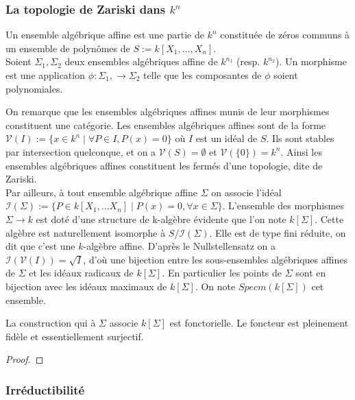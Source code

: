 \subsubsection{La topologie de Zariski dans $k^n$}
\begin{defn}
Un ensemble algébrique affine est une partie de $k^n$ constituée de zéros communs à un ensemble de polynômes de $S:=k[X_1,...,X_n]$.\\
Soient $\Sigma_1,\Sigma_2$ deux ensembles algébriques affine de $k^{n_1}$ (resp. $k^{n_2}$). Un morphisme est une application $\phi:\Sigma_1,\rightarrow \Sigma_2$ telle que les composantes de $\phi$ soient polynomiales.
\end{defn}
On remarque que les ensembles algébriques affines munis de leur morphismes constituent une catégorie. 
Les ensembles algébriques affines sont de la forme $\mathcal{V}(I):=\lbrace x\in k^n\mid \forall P\in I, P(x)=0\rbrace$ où $I$ est un idéal de $S$. Ils sont stables par intersection quelconque, et on a $\mathcal{V}(S)=\emptyset$ et $\mathcal{V}(\lbrace 0\rbrace)=k^n$. Ainsi les ensembles algébriques affines constituent les fermés d'une topologie, dite de Zariski.\\
Par ailleurs, à tout ensemble algébrique affine $\Sigma$ on associe l'idéal $\mathcal{I}(\Sigma):=\lbrace P\in k[X_1,...X_n] \mid P(x)=0, \forall x\in\Sigma \rbrace$. L'ensemble des morphismes $\Sigma\rightarrow k$ est doté d'une structure de k-algèbre évidente que l'on note $k[\Sigma]$. Cette algèbre est naturellement isomorphe à $S/\mathcal{I}(\Sigma)$. Elle est de type fini réduite, on dit que c'est une $k$-algèbre affine. D'après le Nullstellensatz on a $\mathcal{I}(\mathcal{V}(I))= \sqrt{I}$, d'où une bijection entre les sous-ensembles algébriques affines de $\Sigma$ et les idéaux radicaux de $k[\Sigma]$. En particulier les points de $\Sigma$ sont en bijection avec les idéaux maximaux de $k[\Sigma]$. On note $Specm(k[\Sigma])$ cet ensemble.
\begin{prop}\label{eqaffinevaralg}
La construction qui à $\Sigma$ associe $k[\Sigma]$ est fonctorielle. Le foncteur est pleinement fidèle et essentiellement surjectif.
\end{prop}
\begin{proof}

\end{proof}
\subsubsection{Irréductibilité}
\begin{defn}

\end{defn}
